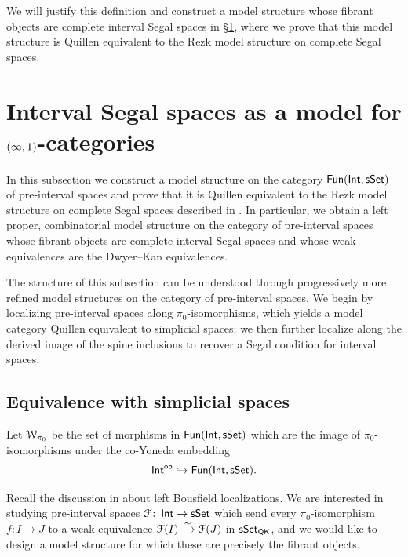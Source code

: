 We will justify this definition and construct a model structure whose fibrant objects are complete interval Segal spaces in §\ref{ch2:: subsec: interval_spaces_model_infinity_cats}, where we prove that this model structure is Quillen equivalent to the Rezk model structure on complete Segal spaces.


\section{Interval Segal spaces as a model for \texorpdfstring{$(\operatorname{\infty},1)$}{(infty,1)}-categories}
\label{ch2:: subsec: interval_spaces_model_infinity_cats}

In this subsection we construct a model structure on the category
$\operatorname{\sf Fun}(\operatorname{\mathsf{Int}},\operatorname{\sf sSet})$ of pre-interval spaces and prove that it is Quillen
equivalent to the Rezk model structure \cite{Rezk01} on complete Segal spaces
described in . In particular, we obtain
a left proper, combinatorial model structure on the category of pre-interval
spaces whose fibrant objects are complete interval Segal spaces and whose weak
equivalences are the Dwyer--Kan equivalences.

\medskip

\nid The structure of this subsection can be understood through progressively more refined model structures on the category of pre-interval spaces. We begin by localizing pre-interval spaces along $\pi_0$-isomorphisms, which yields a model category Quillen equivalent to simplicial spaces; we then further localize along the derived image of the spine inclusions to recover a Segal condition for interval spaces.

\subsection{Equivalence with simplicial spaces}

\begin{definition}\label{ch2:: def: pi_0 equiv}
    Let $\mathcal W_{\pi_0}$ be the set of morphisms in $\operatorname{\sf Fun}(\operatorname{\mathsf{Int}},\operatorname{\sf sSet})$ which are the image of $\pi_0$-isomorphisms under the co-Yoneda embedding 
    \begin{equation}
        \operatorname{\mathsf{Int}}^{\mathsf{op}} \hookrightarrow \operatorname{\sf Fun}(\operatorname{\mathsf{Int}},\operatorname{\sf sSet}).
    \end{equation}
\end{definition}

\medskip

Recall the discussion in
 about left Bousfield
localizations. We are interested in studying pre-interval spaces
$\mathcal F\colon \operatorname{\mathsf{Int}} \to \operatorname{\sf sSet}$ which send every $\pi_0$-isomorphism $f\colon I \to
J$ to a weak equivalence $\mathcal F(I) \xrightarrow{\simeq} \mathcal F(J)$ in $\operatorname{\sf sSet}_{\sf QK}$, and
we would like to design a model structure for which these are precisely the
fibrant objects.


